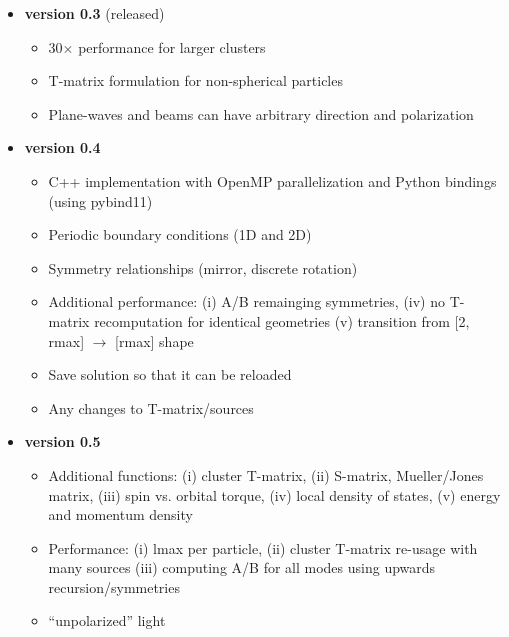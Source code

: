 \documentclass[11pt]{article}
\begin{document}
\begin{itemize}
    \item[] \textbf{version 0.3} (released)
        \begin{itemize}[label={\tiny\raisebox{1ex}{\textbullet}}]
            \item 30$\times$ performance for larger clusters
            \item T-matrix formulation for non-spherical particles
            \item Plane-waves and beams can have arbitrary direction and polarization
        \end{itemize}
    \item[] \textbf{version 0.4}
        \begin{itemize}[label={\tiny\raisebox{1ex}{\textbullet}}]
            \item C++ implementation with OpenMP parallelization and Python bindings (using pybind11)
            \item Periodic boundary conditions (1D and 2D)
            \item Symmetry relationships (mirror, discrete rotation)
            \item Additional performance: 
                        (i) A/B remainging symmetries, 
                        (iv) no T-matrix recomputation for identical geometries
                        (v) transition from [2, rmax] $\rightarrow$ [rmax] shape
                    \item Save solution so that it can be reloaded
            \item Any changes to T-matrix/sources
        \end{itemize}
    \item[] \textbf{version 0.5}
        \begin{itemize}[label={\tiny\raisebox{1ex}{\textbullet}}]
            \item Additional functions: 
                       (i) cluster T-matrix,
                       (ii) S-matrix, Mueller/Jones matrix,
                       (iii) spin vs. orbital torque,
                       (iv) local density of states,
                       (v) energy and momentum density
            \item Performance:
                        (i) lmax per particle,
                        (ii) cluster T-matrix re-usage with many sources
                        (iii) computing A/B for all modes using upwards recursion/symmetries
            \item ``unpolarized'' light

\end{itemize}
\end{itemize}
\end{document}
